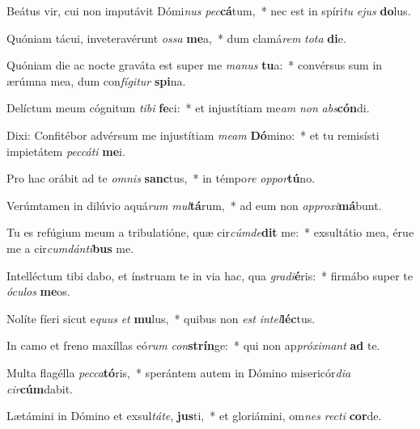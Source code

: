 \item Beátus vir, cui non imputávit Dómi\textit{nus} \textit{pec}\textbf{cá}tum,~* nec est in spíri\textit{tu} \textit{e}\textit{jus} \textbf{do}lus.
\item Quóniam tácui, inveteravérunt \textit{os}\textit{sa} \textbf{me}a,~* dum clamá\textit{rem} \textit{to}\textit{ta} \textbf{di}e.
\item Quóniam die ac nocte graváta est super me \textit{ma}\textit{nus} \textbf{tu}a:~* convérsus sum in ærúmna mea, dum con\textit{fí}\textit{gi}\textit{tur} \textbf{spi}na.
\item Delíctum meum cógnitum \textit{ti}\textit{bi} \textbf{fe}ci:~* et injustítiam me\textit{am} \textit{non} \textit{abs}\textbf{cón}di.
\item Dixi: Confitébor advérsum me injustítiam \textit{me}\textit{am} \textbf{Dó}mino:~* et tu remisísti impietátem \textit{pec}\textit{cá}\textit{ti} \textbf{me}i.
\item Pro hac orábit ad te \textit{om}\textit{nis} \textbf{sanc}tus,~* in témpo\textit{re} \textit{op}\textit{por}\textbf{tú}no.
\item Verúmtamen in dilúvio aquá\textit{rum} \textit{mul}\textbf{tá}rum,~* ad eum non \textit{ap}\textit{pro}\textit{xi}\textbf{má}bunt.
\item Tu es refúgium meum a tribulatióne, quæ cir\textit{cúm}\textit{de}\textbf{dit} me:~* exsultátio mea, érue me a cir\textit{cum}\textit{dán}\textit{ti}\textbf{bus} me.
\item Intelléctum tibi dabo, et ínstruam te in via hac, qua \textit{gra}\textit{di}\textbf{é}ris:~* firmábo super te \textit{ó}\textit{cu}\textit{los} \textbf{me}os.
\item Nolíte fíeri sicut e\textit{quus} \textit{et} \textbf{mu}lus,~* quibus non \textit{est} \textit{in}\textit{tel}\textbf{léc}tus.
\item In camo et freno maxíllas eó\textit{rum} \textit{con}\textbf{strín}ge:~* qui non ap\textit{pró}\textit{xi}\textit{mant} \textbf{ad} te.
\item Multa flagélla \textit{pec}\textit{ca}\textbf{tó}ris,~* sperántem autem in Dómino misericór\textit{di}\textit{a} \textit{cir}\textbf{cúm}dabit.
\item Lætámini in Dómino et exsul\textit{tá}\textit{te}, \textbf{jus}ti,~* et gloriámini, om\textit{nes} \textit{rec}\textit{ti} \textbf{cor}de.

